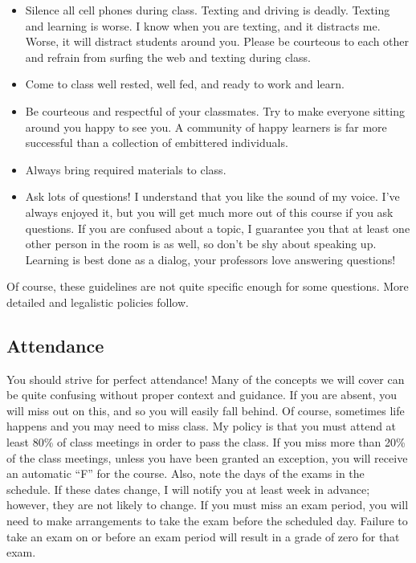 \documentclass[11pt]{article}
\begin{document}
\begin{itemize}
\item Silence all cell phones during class. Texting and driving is
deadly. Texting and learning is worse. I know when you are texting,
and it distracts me. Worse, it will distract students around you.
Please be courteous to each other and refrain from surfing the web and
texting during class.
\item Come to class well rested, well fed, and ready to work and learn.
\item Be courteous and respectful of your classmates. Try to make
everyone sitting around you happy to see you. A community of happy
learners is far more successful than a collection of embittered
individuals.
\item Always bring required materials to class.
\item Ask lots of questions! I understand that you like the sound of
my voice. I've always enjoyed it, but you will get much more out of
this course if you ask questions. If you are confused about a topic,
I guarantee you that at least one other person in the room is as well,
so don't be shy about speaking up. Learning is best done as
a dialog, your professors love answering questions!
\end{itemize}

Of course, these guidelines are not quite specific enough for some
questions. More detailed and legalistic policies follow.

\subsection*{Attendance}
You should strive for perfect attendance! Many of the concepts we will
cover can be quite confusing without proper context and guidance. If
you are absent, you will miss out on this, and so you will easily fall
behind. Of course, sometimes life happens and you may need to miss
class. My policy is that you must attend at least 80\% of class
meetings in order to pass the class. If you miss more than 20\% of the
class meetings, unless you have been granted an exception, you will
receive an automatic ``F'' for the course. Also, note the days
of the exams in the schedule. If these dates change, I will notify you
at least week in advance; however, they are not likely to change. If
you must miss an exam period, you will need to make arrangements to
take the exam before the scheduled day. Failure to take an exam on or
before an exam period will result in a grade of zero for that exam.  
\end{document}
